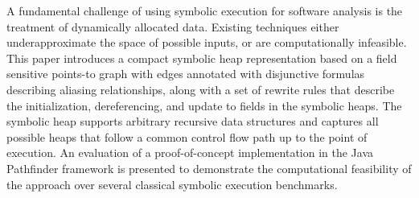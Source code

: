 
A fundamental challenge of using symbolic execution for software
analysis is the treatment of dynamically allocated data. Existing 
techniques either underapproximate the space of possible inputs, 
or are computationally infeasible. This paper
introduces a compact symbolic heap representation based on a field
sensitive points-to graph with edges annotated with disjunctive
formulas describing aliasing relationships, along with a set of
rewrite rules that describe the initialization, dereferencing, and
update to fields in the symbolic heaps. The symbolic heap supports
arbitrary recursive data structures and captures all possible heaps
that follow a common control flow path up to the point of
execution. An evaluation of a proof-of-concept implementation in the
Java Pathfinder framework is presented to demonstrate the
computational feasibility of the approach over several classical
symbolic execution benchmarks.


